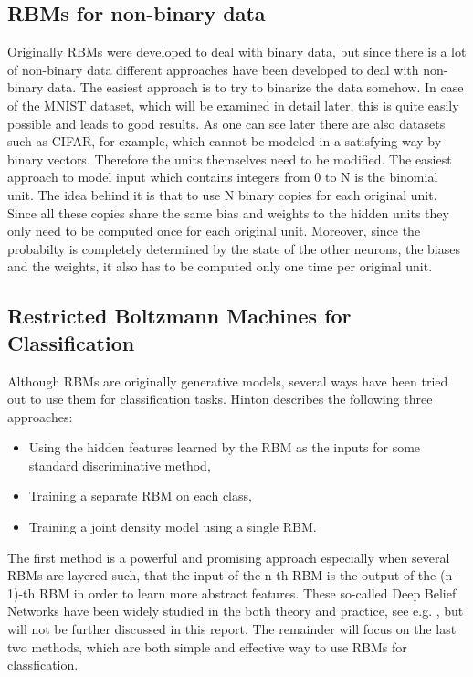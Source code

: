 \documentclass[a4paper]{scrartcl}
\begin{document}
\subsection{RBMs for non-binary data}
Originally RBMs were developed to deal with binary data, but since there is a lot of non-binary data different approaches have been developed to deal with non-binary data. The easiest approach is to try to binarize the data somehow. In case of the MNIST dataset, which will be examined in detail later, this is quite easily possible and leads to good results. As one can see later there are also datasets such as CIFAR, for example, which cannot be modeled in a satisfying way by binary vectors. Therefore the units themselves need to be modified. The easiest approach to model input which contains integers from 0 to N is the binomial unit. The idea behind it is that to use N binary copies for each original unit. Since all these copies share the same bias and weights to the hidden units they only need to be computed once for each original unit. Moreover, since the probabilty is completely determined by the state of the other neurons, the biases and the weights, it also has to be computed only one time per original unit.


\subsection{Restricted Boltzmann Machines for Classification}
Although RBMs are originally generative models, several ways have been tried out to use them for classification tasks. Hinton \cite{Hinton} describes the following three approaches:
\begin{itemize}
    \item Using the hidden features learned by the RBM as the inputs for some standard discriminative method,
    \item Training a separate RBM on each class,
	\item Training a joint density model using a single RBM.
\end{itemize}
The first method is a powerful and promising approach especially when several RBMs are layered such, that the input of the n-th RBM is the output of the (n-1)-th RBM in order to learn more abstract features. These so-called Deep Belief Networks have been widely studied in the both theory and practice, see e.g. \cite{DeepBelief}, but will not be further discussed in this report. The remainder will focus on the last two methods, which are both simple and effective way to use RBMs for classfication. 
\end{document}
